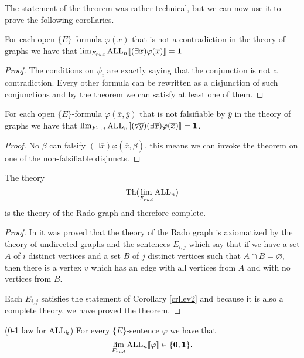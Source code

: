 The statement of the theorem was rather technical, but we can now use it to prove the following corollaries.

\begin{crll}For each open $\{E\}$-formula $\varphi(\overline x)$ that is not a contradiction in the theory of graphs we have that $\lim_{F_{rud}}\text{ALL}_n[\![(\exists \overline x)\varphi(\overline x)]\!]=\textbf{1}.$
\end{crll}
\begin{proof}
The conditions on $\psi_i$ are exactly saying that the conjunction is not a contradiction. Every other formula can be rewritten as a disjunction of such conjunctions and by the theorem we can satisfy at least one of them.
\end{proof}
\begin{crll}\label{crllev2}
For each open $\{E\}$-formula $\varphi(\overline x,\overline y)$ that is not falsifiable by $\overline y$ in the theory of graphs we have that $\lim_{F_{rud}}\text{ALL}_n[\![(\forall \overline y)(\exists \overline x)\varphi(\overline x)]\!]=\textbf{1}$.
\end{crll}
\begin{proof}
No $\overline \beta$ can falsify $(\exists \overline x)\varphi(\overline x,\overline \beta)$, this means we can invoke the theorem on one of the non-falsifiable disjuncts.
\end{proof}

\begin{thrm}\label{thrmall}
The theory \[\text{Th}(\lim_{F_{rud}}\text{ALL}_n)\] is the theory of the Rado graph and therefore complete.
\end{thrm}
\begin{proof}
In \cite{gaifman1964rado} it was proved that the theory of the Rado graph is axiomatized by the theory of undirected graphs and the sentences $E_{i,j}$ which say that if we have a set $A$ of $i$ distinct vertices and a set $B$ of $j$ distinct vertices such that $A\cap B=\varnothing$, then there is a vertex $v$ which has an edge with all vertices from $A$ and with no vertices from $B$.

Each $E_{i,j}$ satisfies the statement of Corollary \ref{crllev2} and because it is also a complete theory, we have proved the theorem.
\end{proof}

\begin{crll}(0-1 law for $\text{ALL}_k$)
For every $\{E\}$-sentence $\varphi$ we have that
\[\lim_{F_{rud}}\text{ALL}_n[\![\varphi]\!]\in\{\textbf{0},\textbf{1}\}.\]
\end{crll}


